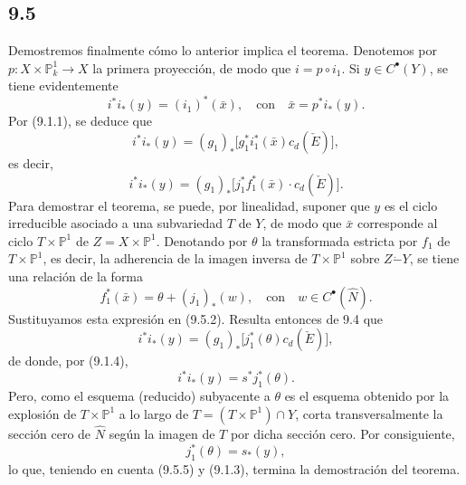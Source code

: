 \subsection*{9.5}

Demostremos finalmente cómo lo anterior implica el teorema. Denotemos por $p:X\times\mathbb P^1_k\to X$ la primera proyección, de modo que $i=p\circ i_1$. Si $y\in C^{\bullet}(Y)$, se tiene evidentemente
\[
i^*i_*(y)=(i_1)^*(\bar x),\quad\text{con}\quad \bar x=p^*i_*(y).
\tag{9.5.1}
\]
Por (9.1.1), se deduce que
\[
i^*i_*(y)=(g_1)_*\bigl[g_1^*i_1^*(\bar x)c_d(\check E)\bigr],
\]
es decir,
\[
i^*i_*(y)=(g_1)_*\bigl[j_1^*f_1^*(\bar x)\cdot c_d(\check E)\bigr].
\tag{9.5.2}
\]
Para demostrar el teorema, se puede, por linealidad, suponer que $y$ es el ciclo irreducible asociado a una subvariedad $T$ de $Y$, de modo que $\bar x$ corresponde al ciclo $T\times\mathbb P^1$ de $Z=X\times\mathbb P^1$. Denotando por $\theta$ la transformada estricta por $f_1$ de $T\times\mathbb P^1$, es decir, la adherencia de la imagen inversa de $T\times\mathbb P^1$ sobre $Z\mathbin{\dot{-}}Y$, se tiene una relación de la forma
\[
f_1^*(\bar x)=\theta+(j_1)_*(w),\quad\text{con}\quad w\in C^{\bullet}(\widehat N).
\tag{9.5.3}
\]
Sustituyamos esta expresión en (9.5.2). Resulta entonces de 9.4 que
\[
i^*i_*(y)=(g_1)_*\bigl[j_1^*(\theta)c_d(\check E)\bigr],
\tag{9.5.4}
\]
de donde, por (9.1.4),
\[
i^*i_*(y)=s^*j_1^*(\theta).
\tag{9.5.5}
\]
Pero, como el esquema (reducido) subyacente a $\theta$ es el esquema obtenido por la explosión de $T\times\mathbb P^1$ a lo largo de $T=(T\times\mathbb P^1)\cap Y$, corta transversalmente la sección cero de $\widehat N$ según la imagen de $T$ por dicha sección cero. Por consiguiente,
\[
j_1^*(\theta)=s_*(y),
\]
lo que, teniendo en cuenta (9.5.5) y (9.1.3), termina la demostración del teorema.
